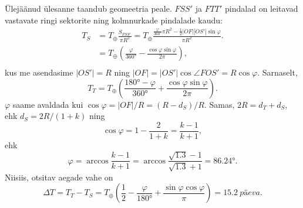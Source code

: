 \documentclass[10pt]{article}
\begin{document}
Ülejäänud ülesanne taandub geomeetria peale. $FSS'$ ja $FTT'$ pindalad on leitavad vastavate ringi sektorite ning kolmnurkade pindalade kaudu:
\begin{align*}
	T_S &= T_\oplus \frac{S_{FSS'}}{\pi R^2} = T_\oplus \frac{\frac{\varphi}{\ang{360}}\pi R^2 - \frac 12|OF||OS'|\sin\varphi}{\pi R^2}.\\
	&= T_\oplus \left(\frac{\varphi}{\ang{360}} - \frac{\cos\varphi\sin\varphi}{2\pi}\right),\\
\end{align*}
kus me asendasime $|OS'| = R$ ning $|OF| = |OS'|\cos\angle FOS' = R\cos\varphi$. Sarnaselt,
\[
T_T = T_\oplus \left(\frac{\ang{180} - \varphi}{\ang{360}} + \frac{\cos\varphi\sin\varphi}{2\pi}\right).
\]
$\varphi$ saame avaldada kui $\cos\varphi = |OF| / R = (R - d_S) / R$. Samas, $2R = d_T + d_S$, ehk $d_S = 2R/(1 + k)$ ning 
\[
\cos\varphi = 1 - \frac{2}{1 + k} = \frac{k - 1}{k + 1},
\]
ehk
\[
\varphi = \arccos\frac{k - 1}{k + 1} = \arccos\frac{\sqrt{\num{1.3}} - 1}{\sqrt{\num{1.3}} + 1} = \ang{86.24}.
\]
Niisiis, otsitav aegade vahe on 
\[
\Delta T = T_T - T_S = T_\oplus \left(\frac{1}{2} - \frac{\varphi}{\ang{180}} + \frac{\sin\varphi\cos\varphi}{\pi}\right) = \SI{15.2}{päeva}.
\]
\probend
\bigskip

\setAuthor{}
\end{document}
